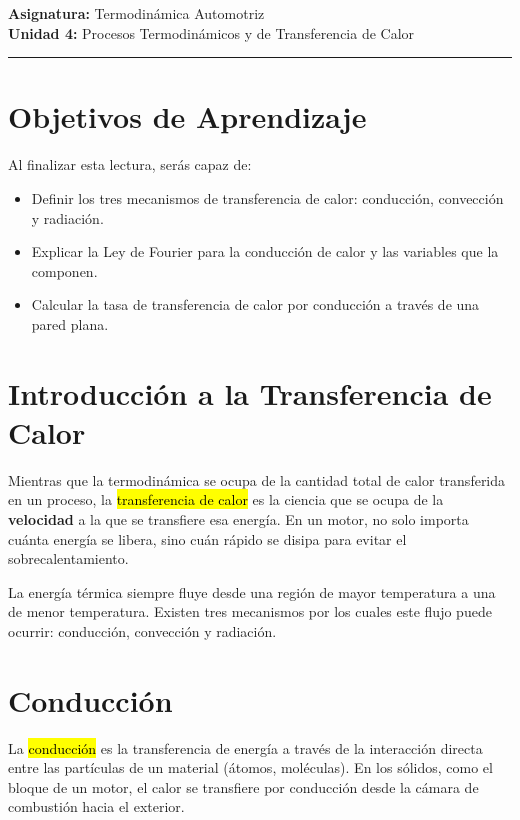 \documentclass{article}
\begin{document}

\textbf{Asignatura:} Termodinámica Automotriz \\
\textbf{Unidad 4:} Procesos Termodinámicos y de Transferencia de Calor

\vspace{5mm}
\hrule
\vspace{5mm}

\section*{Objetivos de Aprendizaje}
Al finalizar esta lectura, serás capaz de:

\begin{itemize}
    \item Definir los tres mecanismos de transferencia de calor: conducción, convección y radiación.
    \item Explicar la Ley de Fourier para la conducción de calor y las variables que la componen.
    \item Calcular la tasa de transferencia de calor por conducción a través de una pared plana.
\end{itemize}

\section*{Introducción a la Transferencia de Calor}

Mientras que la termodinámica se ocupa de la cantidad total de calor transferida en un proceso, la \hl{transferencia de calor} es la ciencia que se ocupa de la \textbf{velocidad} a la que se transfiere esa energía. En un motor, no solo importa cuánta energía se libera, sino cuán rápido se disipa para evitar el sobrecalentamiento.

La energía térmica siempre fluye desde una región de mayor temperatura a una de menor temperatura. Existen tres mecanismos por los cuales este flujo puede ocurrir: conducción, convección y radiación.

\section*{Conducción}

La \hl{conducción} es la transferencia de energía a través de la interacción directa entre las partículas de un material (átomos, moléculas). En los sólidos, como el bloque de un motor, el calor se transfiere por conducción desde la cámara de combustión hacia el exterior.
\end{document}

